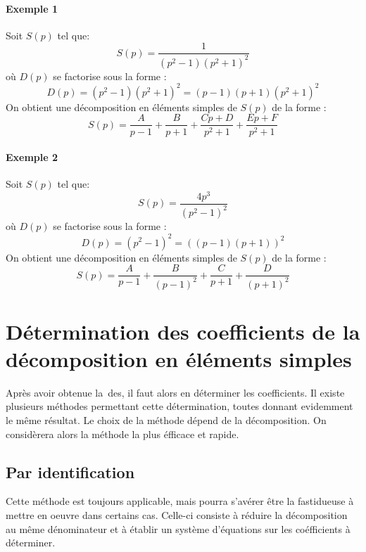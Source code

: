 \paragraph{Exemple 1}
Soit $S(p)$ tel que:
\[
S(p)=\dfrac{1}{(p^2-1)(p^2+1)^2}
\]
où $D(p)$ se factorise sous la forme :
\[
D(p)=(p^2-1)(p^2+1)^2=(p-1)(p+1)(p^2+1)^2
\]
On obtient une décomposition en éléments simples de $S(p)$ de la forme :
\[
S(p)=\dfrac{A}{p-1}+\dfrac{B}{p+1}+\dfrac{Cp+D}{p^2+1}+\dfrac{Ep+F}{p^2+1}
\]

\paragraph{Exemple 2}
Soit $S(p)$ tel que:
\[
S(p)=\dfrac{4p^3}{(p^2-1)^2}
\]
où $D(p)$ se factorise sous la forme :
\[
D(p)=(p^2-1)^2=\left((p-1)(p+1)\right)^2
\]
On obtient une décomposition en éléments simples de $S(p)$ de la forme :
\[
S(p)=\dfrac{A}{p-1}+\dfrac{B}{(p-1)^2}+\dfrac{C}{p+1}+\dfrac{D}{(p+1)^2}
\]
\section[Détermination des coefficients de la DES]
        {Détermination des coefficients de la 
         décomposition en éléments simples}
Après avoir obtenue la~\gls{des}, il faut alors en déterminer les coefficients.
Il existe plusieurs méthodes permettant cette détermination, toutes donnant 
evidemment le même résultat. Le choix de la méthode dépend de la décomposition.
On considèrera alors la méthode la plus éfficace et rapide.

\subsection{Par identification}
Cette méthode est toujours applicable, mais pourra s'avérer être la fastidueuse
à mettre en oeuvre dans certains cas.
Celle-ci consiste à réduire la décomposition au même dénominateur et à établir
un système d'équations sur les coéfficients à déterminer.


